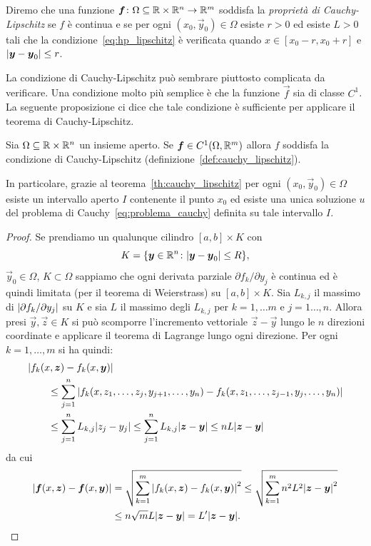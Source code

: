 \begin{definition}%
\label{def:cauchy_lipschitz}%
Diremo che una funzione $\boldsymbol f\colon \Omega\subseteq {\mathbb R}\times {\mathbb R}^n \to {\mathbb R}^m$
soddisfa la \emph{proprietà di Cauchy-Lipschitz}%
 se $f$ è continua e se
per ogni $(x_0,\vec y_0)\in \Omega$ esiste $r>0$ ed esiste $L>0$
tali che la condizione~\eqref{eq:hp_lipschitz} è verificata 
quando $x\in [x_0-r, x_0+r]$ e ${\left|\boldsymbol y-\boldsymbol y_0\right|}\le r$.
\end{definition}
 
La condizione di Cauchy-Lipschitz può sembrare piuttosto complicata
da verificare. Una condizione molto più semplice  è che la funzione $\vec f$
sia di classe $C^1$. La seguente proposizione ci dice che tale
condizione è sufficiente per applicare il teorema di Cauchy-Lipschitz.

\begin{proposition}%
\mymark{***}%
Sia $\Omega \subseteq {\mathbb R}\times {\mathbb R}^n$ un insieme aperto.
Se $\boldsymbol f\in C^1(\Omega,{\mathbb R}^m)$ 
allora $f$ soddisfa la condizione
di Cauchy-Lipschitz (definizione~\ref{def:cauchy_lipschitz}).

In particolare, grazie al teorema~\ref{th:cauchy_lipschitz} 
per ogni $(x_0,\vec y_0)\in \Omega$ esiste un intervallo aperto 
$I$ contenente il punto $x_0$
ed esiste una unica soluzione $u$ 
del problema di Cauchy~\eqref{eq:problema_cauchy} definita 
su tale intervallo $I$.
\end{proposition}
%
\begin{proof}
\mymark{***}%
Se prendiamo un qualunque cilindro $[a,b]\times K$ con 
\[
  K={\left\{ \boldsymbol y\in {\mathbb R}^n\colon {\left|\boldsymbol y-\boldsymbol y_0\right|}\le R \right\}}, 
\]
$\vec y_0\in \Omega$, $K\subset \Omega$
sappiamo che ogni derivata parziale
$\partial f_k / \partial y_j$ è continua ed è quindi limitata
(per il teorema di Weierstrass) su $[a,b]\times K$. 
Sia $L_{k,j}$ il massimo di ${\left|\partial f_k / \partial y_j\right|}$ su $K$ e sia
$L$ il massimo degli $L_{k,j}$ per $k=1,\dots m$ e $j=1\dots,n$.
Allora presi $\vec y, \vec z\in K$ si può scomporre l'incremento vettoriale 
$\vec z - \vec y$ lungo le $n$ direzioni coordinate e applicare il teorema di Lagrange lungo ogni direzione.
Per ogni $k = 1,\dots, m$ si ha quindi:
\begin{align*}
\MoveEqLeft
\abs{f_k(x,\vec z)-f_k(x,\vec y)}\\
&\le \sum_{j=1}^n \abs{f_k(x,z_1, \dots, z_j, y_{j+1}, \dots, y_n) - f_k(x,z_1, \dots, z_{j-1}, y_j, \dots, y_n)}\\
&\le \sum_{j=1}^n L_{k,j} \abs{z_j-y_j}
\le \sum_{j=1}^n L_{k,j} \abs{\vec z-\vec y}
\le n L \abs{\vec z-\vec y}
\end{align*}
da cui
\begin{align*}
  {\left|\boldsymbol f(x,\boldsymbol z) - \boldsymbol f(x,\boldsymbol y)\right|}
  &= \sqrt{\sum_{k=1}^m {\left|f_k(x,\boldsymbol z) - f_k(x,\boldsymbol y)\right|}^2} 
  \le \sqrt{\sum_{k=1}^m n^2 L^2 {\left|\boldsymbol z-\boldsymbol y\right|}^2} \\
  &\le n\sqrt{m} L {\left|\boldsymbol z-\boldsymbol y\right|} = L' {\left|\boldsymbol z-\boldsymbol y\right|}.
\end{align*}
\end{proof}

